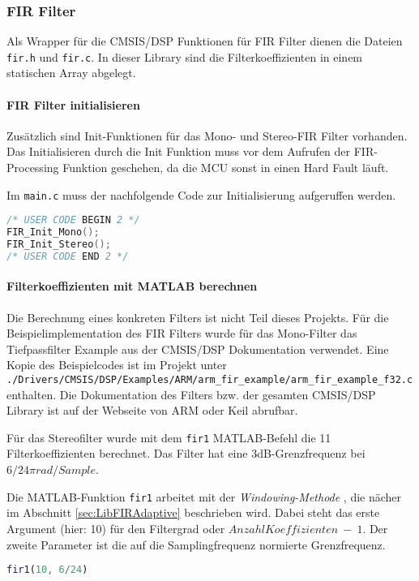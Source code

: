 \subsubsection{FIR Filter}
\label{sec:LibFIRFilter}

Als Wrapper für die CMSIS/DSP Funktionen für FIR Filter dienen die Dateien \texttt{fir.h} und \texttt{fir.c}. In dieser Library sind die Filterkoeffizienten in einem statischen Array abgelegt.


\paragraph{FIR Filter initialisieren}

Zusätzlich sind Init-Funktionen für das Mono- und Stereo-FIR Filter vorhanden. 
Das Initialisieren durch die Init Funktion muss vor dem Aufrufen der FIR-Processing Funktion geschehen, da die MCU sonst in einen Hard Fault läuft.

Im \texttt{main.c} muss der nachfolgende Code zur Initialisierung aufgeruffen werden.

\begin{lstlisting}[language=c]
/* USER CODE BEGIN 2 */
FIR_Init_Mono();
FIR_Init_Stereo();
/* USER CODE END 2 */
\end{lstlisting}


\paragraph{Filterkoeffizienten mit MATLAB berechnen}

Die Berechnung eines konkreten Filters ist nicht Teil dieses Projekts.
Für die Beispielimplementation des FIR Filters wurde für das Mono-Filter das Tiefpassfilter Example aus der CMSIS/DSP Dokumentation verwendet. 
Eine Kopie des Beispielcodes ist im Projekt unter \texttt{./Drivers/CMSIS/DSP/Examples/ARM/arm\_fir\_example/arm\_fir\_example\_f32.c} enthalten.
Die Dokumentation des Filters bzw. der gesamten CMSIS/DSP Library ist auf der Webseite von ARM \cite{cmsis-doc-arm} oder Keil \cite{cmsis-doc-keil} abrufbar.

Für das Stereofilter wurde mit dem \texttt{fir1} MATLAB-Befehl die 11 Filterkoeffizienten berechnet. Das Filter hat eine 3dB-Grenzfrequenz bei $6/24 \pi rad/Sample$.

Die MATLAB-Funktion \texttt{fir1} arbeitet mit der \textit{Windowing-Methode} \cite{FIR-Windowing}, die nächer im Abschnitt \ref{sec:LibFIRAdaptive} beschrieben wird.
Dabei steht das erste Argument (hier: 10) für den Filtergrad oder $Anzahl Koeffizienten\ -\ 1$. Der zweite Parameter ist die auf die Samplingfrequenz normierte Grenzfrequenz.

\begin{lstlisting}[language=matlab]
fir1(10, 6/24)
\end{lstlisting}


